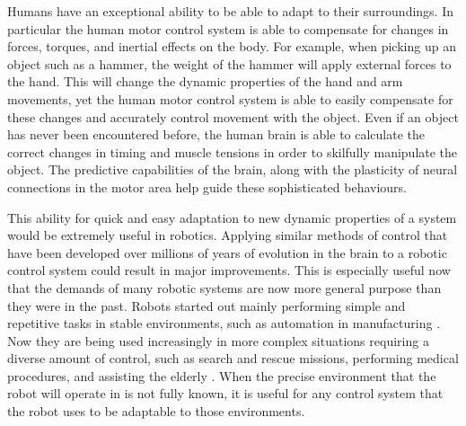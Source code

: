 \documentclass[letterpaper,12pt,titlepage,oneside,final]{book}
\begin{document}
Humans have an exceptional ability to be able to adapt to their surroundings.
In particular the human motor control system is able to compensate for changes in forces, torques, and inertial effects on the body.
For example, when picking up an object such as a hammer, the weight of the hammer will apply external forces to the hand.
This will change the dynamic properties of the hand and arm movements, yet the human motor control system is able to easily compensate for these changes and accurately control movement with the object.
Even if an object has never been encountered before, the human brain is able to calculate the correct changes in timing and muscle tensions in order to skilfully manipulate the object. %
The predictive capabilities of the brain, along with the plasticity of neural connections in the motor area help guide these sophisticated behaviours.

This ability for quick and easy adaptation to new dynamic properties of a system would be extremely useful in robotics. 
Applying similar methods of control that have been developed over millions of years of evolution in the brain to a robotic control system could result in major improvements. 
This is especially useful now that the demands of many robotic systems are now more general purpose than they were in the past. 
Robots started out mainly performing simple and repetitive tasks in stable environments, such as automation in manufacturing \cite{garcia2007evolution}. 
Now they are being used increasingly in more complex situations requiring a diverse amount of control, such as search and rescue missions, performing medical procedures, and assisting the elderly \cite{garcia2007evolution, hockstein2007history, nourbakhsh2005human, lacey1998application}. 
When the precise environment that the robot will operate in is not fully known, it is useful for any control system that the robot uses to be adaptable to those environments.
\end{document}
